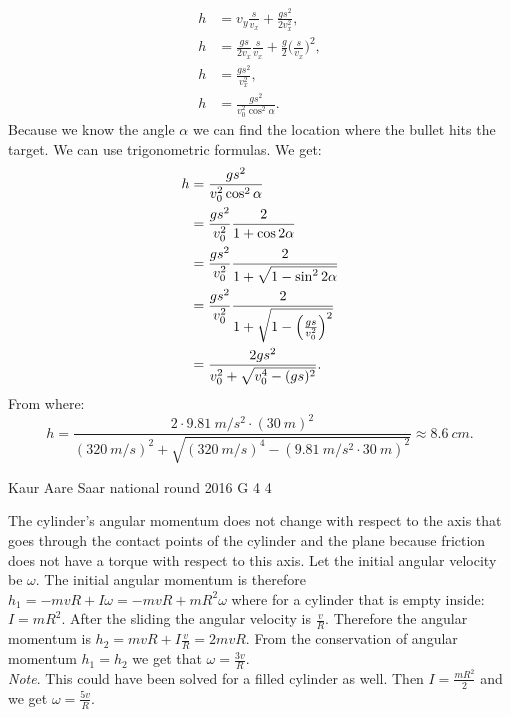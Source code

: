 \documentclass[11pt]{article}
\begin{document}
{\begin{align*}
h & = v_{y}\frac{s}{v_{x}}+\frac{gs^2}{2v_{x}^2},\\
h & = \frac{gs}{2v_x}\frac{s}{v_{x}}+\frac{g}{2}\Big(\frac{s}{v_{x}}\Big)^2,\\
h & = \frac{gs^2}{v_{x}^2},\\
h & = \frac{gs^2}{v_{0}^2\cos^2\alpha}.
\end{align*} 
Because we know the angle $\alpha$ we can find the location where the bullet hits the target. We can use trigonometric formulas. We get:
\begin{align*}
h & = {gs^2 \over v_{0}^2\cos^2\alpha}\\
& = {gs^2 \over v_{0}^2}{2 \over 1+\cos2\alpha}\\
& = {gs^2 \over v_{0}^2}{2 \over 1+\sqrt{1-\sin^2 2\alpha}}\\
& = {gs^2 \over v_{0}^2}{2 \over 1+\sqrt{1-\Big({gs \over v_0^2}\Big)^2}}\\
& = {2gs^2 \over v_0^2+\sqrt{v_0^4-(gs)^2}}.
\end{align*}
From where:
$$
h  = \frac{2\cdot \SI{9,81}{m/s^2} \cdot (\SI{30}{m})^2}{(\SI{320}{m/s})^2+\sqrt{(\SI{320}{m/s})^4-(\SI{9,81}{m/s^2} \cdot \SI{30}{m})^2}} \approx \SI{8,6}{cm}.
$$
\fi
}

{Kaur Aare Saar} %
{national round} %
{2016} %
{G 4} %
{4} %
{

\ifEngSolution
The cylinder’s angular momentum does not change with respect to the axis that goes through the contact points of the cylinder and the plane because friction does not have a torque with respect to this axis. Let the initial angular velocity be $\omega$. The initial angular momentum is therefore $h_1=-mvR+I\omega=-mvR+mR^2\omega$ where for a cylinder that is empty inside: $I=mR^2$. After the sliding the angular velocity is $\frac{v}{R}$. Therefore the angular momentum is $h_2=mvR+I\frac{v}{R}=2mvR$. From the conservation of angular momentum $h_1=h_2$ we get that $\omega=\frac{3v}{R}$.\\
\emph{Note}. This could have been solved for a filled cylinder as well. Then $I=\frac{mR^2}{2}$ and we get $\omega = \frac{5v}{R}$.
\fi
}
\end{document}
